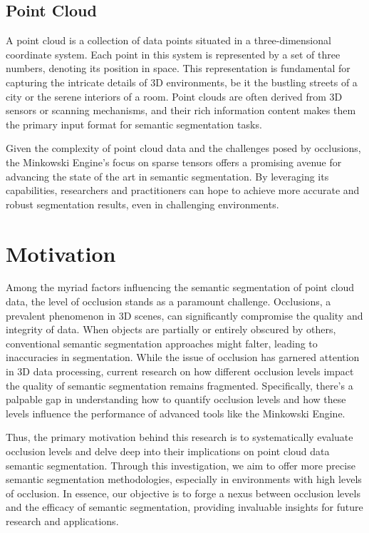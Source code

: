 \documentclass[11pt, a4paper,oneside,chapterprefix=false]{scrbook}
\begin{document}
\subsection{Point Cloud}

A point cloud is a collection of data points situated in a three-dimensional coordinate system. Each point in this system is represented by a set of three numbers, denoting its position in space. This representation is fundamental for capturing the intricate details of 3D environments, be it the bustling streets of a city or the serene interiors of a room. Point clouds are often derived from 3D sensors or scanning mechanisms, and their rich information content makes them the primary input format for semantic segmentation tasks.

Given the complexity of point cloud data and the challenges posed by occlusions, the Minkowski Engine's focus on sparse tensors offers a promising avenue for advancing the state of the art in semantic segmentation. By leveraging its capabilities, researchers and practitioners can hope to achieve more accurate and robust segmentation results, even in challenging environments.

\section{Motivation} \label{sec:motivation}

Among the myriad factors influencing the semantic segmentation of point cloud data, the level of occlusion stands as a paramount challenge. Occlusions, a prevalent phenomenon in 3D scenes, can significantly compromise the quality and integrity of data. When objects are partially or entirely obscured by others, conventional semantic segmentation approaches might falter, leading to inaccuracies in segmentation. While the issue of occlusion has garnered attention in 3D data processing, current research on how different occlusion levels impact the quality of semantic segmentation remains fragmented. Specifically, there's a palpable gap in understanding how to quantify occlusion levels and how these levels influence the performance of advanced tools like the Minkowski Engine. 

Thus, the primary motivation behind this research is to systematically evaluate occlusion levels and delve deep into their implications on point cloud data semantic segmentation. Through this investigation, we aim to offer more precise semantic segmentation methodologies, especially in environments with high levels of occlusion. In essence, our objective is to forge a nexus between occlusion levels and the efficacy of semantic segmentation, providing invaluable insights for future research and applications.
\end{document}
